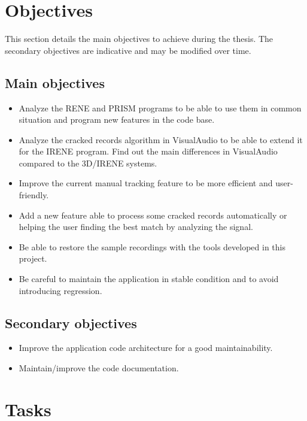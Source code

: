 \section{Objectives}

This section details the main objectives to achieve during the thesis. The secondary objectives are indicative and may be modified over time.

\subsection{Main objectives}
\label{sec:mainobjectives}

\begin{itemize}
    \item Analyze the RENE and PRISM programs to be able to use them in common situation and program new features in the code base.
    \item Analyze the cracked records algorithm in VisualAudio to be able to extend it for the IRENE program. Find out the main differences in VisualAudio compared to the 3D/IRENE systems.
    \item Improve the current manual tracking feature to be more efficient and user-friendly.
    \item Add a new feature able to process some cracked records automatically or helping the user finding the best match by analyzing the signal.
    \item Be able to restore the sample recordings with the tools developed in this project.
    \item Be careful to maintain the application in stable condition and to avoid introducing regression.
\end{itemize}

\subsection{Secondary objectives}

\begin{itemize}
    \item Improve the application code architecture for a good maintainability.
    \item Maintain/improve the code documentation.
\end{itemize}

\section{Tasks}

